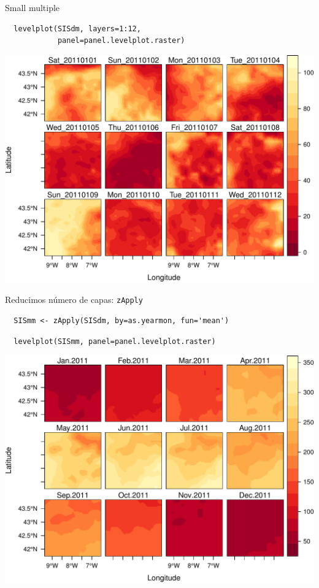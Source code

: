 \documentclass[xcolor={usenames,svgnames,dvipsnames}]{beamer}
\begin{document}
\begin{frame}[fragile,label=sec-4-2-1]{Small multiple}
 \lstset{language=R,label= ,caption= ,numbers=none}
\begin{lstlisting}
  levelplot(SISdm, layers=1:12,
            panel=panel.levelplot.raster)
\end{lstlisting}


\includegraphics[width=.9\linewidth]{figs/SISdm.pdf}
\end{frame}

\begin{frame}[fragile,label=sec-4-2-2]{Reducimos número de capas: \texttt{zApply}}
 \lstset{language=R,label= ,caption= ,numbers=none}
\begin{lstlisting}
  SISmm <- zApply(SISdm, by=as.yearmon, fun='mean')
\end{lstlisting}

\lstset{language=R,label= ,caption= ,numbers=none}
\begin{lstlisting}
  levelplot(SISmm, panel=panel.levelplot.raster)
\end{lstlisting}

\includegraphics[width=.9\linewidth]{figs/SISmm.pdf}
\end{frame}
\end{document}
